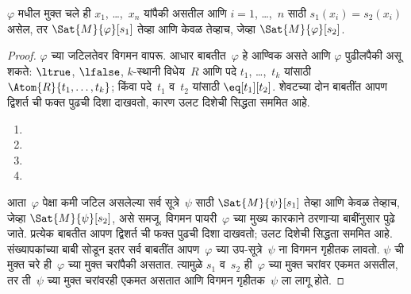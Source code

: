 \begin{prop}\label{fol:syn:ass:prop:satindep}
$\varphi$ मधील मुक्त चले ही $x_1$, \dots,~$x_n$ यांपैकी असतील आणि
$i = 1$, \dots,~$n$ साठी $s_1(x_i) = s_2(x_i)$ असेल, तर
$\Sat{M}{\varphi}[s_1]$ तेव्हा आणि केवळ तेव्हाच, जेव्हा
$\Sat{M}{\varphi}[s_2]$.
\end{prop}

\begin{proof}
$\varphi$ च्या जटिलतेवर विगमन वापरू. आधार बाबतीत~$\varphi$ हे आण्विक असते आणि
$\varphi$ पुढीलपैकी असू शकते:
$\ltrue$,
$\lfalse$,
$k$-स्थानी विधेय~$R$ आणि पदे $t_1$, \dots,~$t_k$ यांसाठी
$\Atom{R}{t_1, \dots, t_k}$; किंवा पदे~$t_1$ व~$t_2$ यांसाठी
$\eq[t_1][t_2]$. शेवटच्या दोन बाबतींत आपण द्विशर्त ची फक्त
पुढची दिशा दाखवतो, कारण उलट दिशेची सिद्धता सममित आहे.

\begin{enumerate}
\item

\item

\item
\item
\end{enumerate}

आता~$\varphi$ पेक्षा कमी जटिल असलेल्या सर्व सूत्रे~$\psi$ साठी
$\Sat{M}{\psi}[s_1]$ तेव्हा आणि केवळ तेव्हाच, जेव्हा
$\Sat{M}{\psi}[s_2]$, असे समजू. विगमन पायरी~$\varphi$ च्या मुख्य कारकाने
ठरणाऱ्या बाबींनुसार पुढे जाते. प्रत्येक बाबतीत आपण द्विशर्त ची
फक्त पुढची दिशा दाखवतो; उलट दिशेची सिद्धता सममित आहे. संख्यापकांच्या
बाबी सोडून इतर सर्व बाबतींत आपण~$\varphi$ च्या उप-सूत्रे~$\psi$ ना
विगमन गृहीतक लावतो. $\psi$ ची मुक्त चरे ही~$\varphi$ च्या मुक्त चरांपैकी
असतात. त्यामुळे $s_1$ व~$s_2$ ही~$\varphi$ च्या मुक्त चरांवर एकमत असतील,
तर ती~$\psi$ च्या मुक्त चरांवरही एकमत असतात आणि विगमन गृहीतक~$\psi$ ला
लागू होते.


\end{proof}
